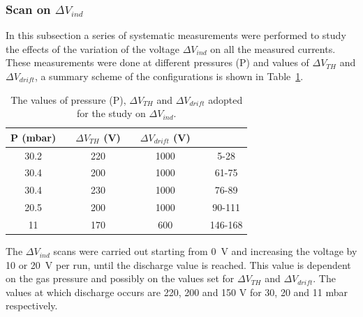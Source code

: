 \documentclass[a4paper, 11 pt]{report}
\newcommand{\Vind}{$\Delta V_{ind}$}
\newcommand{\Vthgem}{$\Delta V_{TH}$}
\newcommand{\Vdrift}{$ \Delta V_{drift}$}
\begin{document}
\subsubsection{Scan on \Vind}
In this subsection a series of systematic measurements were performed to study the effects of the 
variation of the voltage \Vind{} on all the measured currents. These measurements were 
done at different pressures (P) and values of \Vthgem{} and \Vdrift{}, a summary scheme of the 
configurations is shown in Table~\ref{tab:FULLTHGEM_vind}.
\begin{table} [b!]
	\begin{center}
		\renewcommand{\arraystretch}{1.2}
		\begin{tabular} {ccccccc}
			P (mbar) & & \Vthgem{} (V) & & \Vdrift{} (V) & & \\
			\toprule[0.1em]
			30.2	& &	220	& &	1000 & & 5-28 \\
			30.4	& &	200	& &	1000 & & 61-75\\
			30.4	& &	230	& &	1000 & & 76-89\\
			20.5	& &	200	& & 1000 & & 90-111\\
			11	    & & 170	& & 600 & & 146-168\\
     		\bottomrule[0.1em]
		\end{tabular}
	\end{center}
	\caption{The values of pressure (P), \Vthgem{} and \Vdrift{} adopted for the study on \Vind.} 
	\label{tab:FULLTHGEM_vind}
\end{table}
The \Vind{} scans were carried out starting from 0~V and increasing the voltage by 10 or 20~V per run, 
until the discharge value is reached.
This value is dependent on the gas pressure and possibly on the values set for \Vthgem{} and \Vdrift.
The values at which discharge occurs are 220, 200 and 150 V for 30, 20 and 11 mbar respectively.\\
\end{document}
